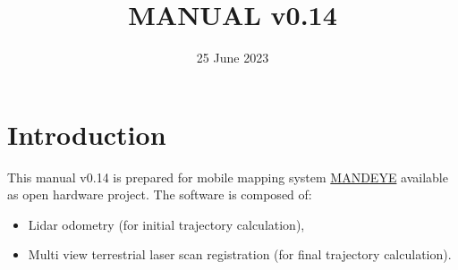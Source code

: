 \documentclass[a4paper,12pt]{book}
\begin{document}
\author{}
\title{MANUAL v0.14}
\date{25 June 2023}

\frontmatter
\maketitle
\tableofcontents

\mainmatter

\chapter{Introduction}
This manual v0.14 is prepared for mobile mapping system \href{https://github.com/JanuszBedkowski/mandeye_controller/blob/main/doc/manual/manual_v0_1/mandeye_dev_manual_v0_1.pdf}{MANDEYE} available as open hardware project.
The software is composed of:
\begin{itemize}
	\item Lidar odometry (for initial trajectory calculation),
	\item Multi view terrestrial laser scan registration (for final trajectory calculation).
\end{itemize}






\backmatter
\end{document}
